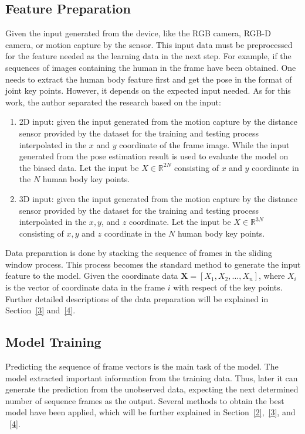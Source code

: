\subsection{Feature Preparation}
Given the input generated from the device, like the RGB camera, RGB-D camera, or motion capture by the sensor. This input data must be preprocessed for the feature needed as the learning data in the next step. For example, if the sequences of images containing the human in the frame have been obtained. One needs to extract the human body feature first and get the pose in the format of joint key points. However, it depends on the expected input needed. As for this work, the author separated the research based on the input:
\begin{enumerate}
    \item 2D input: given the input generated from the motion capture by the distance sensor provided by the dataset for the training and testing process interpolated in the $x$ and $y$ coordinate of the frame image. While the input generated from the pose estimation result is used to evaluate the model on the biased data. Let the input be $X \in \mathbb{R}^{2 N}$ consisting of $x$ and $y$ coordinate in the $N$ human body key points.
    
    \item 3D input: given the input generated from the motion capture by the distance sensor provided by the dataset for the training and testing process interpolated in the $x, y$, and $z$ coordinate.  Let the input be $X \in \mathbb{R}^{3 N}$ consisting of $x, y$ and $z$ coordinate in the $N$ human body key points.
\end{enumerate}

Data preparation is done by stacking the sequence of frames in the sliding window process. This process becomes the standard method to generate the input feature to the model. Given the coordinate data $\mathbf{X} = [X_{1}, X_{2}, \ldots , X_{n}]$, where $X_{i}$ is the vector of coordinate data in the frame $i$ with respect of the key points. Further detailed descriptions of the data preparation will be explained in Section~\ref{3} and~\ref{4}.

\subsection{Model Training}
Predicting the sequence of frame vectors is the main task of the model. The model extracted important information from the training data. Thus, later it can generate the prediction from the unobserved data, expecting the next determined number of sequence frames as the output. Several methods to obtain the best model have been applied, which will be further explained in Section~\ref{2},~\ref{3}, and ~\ref{4}.

